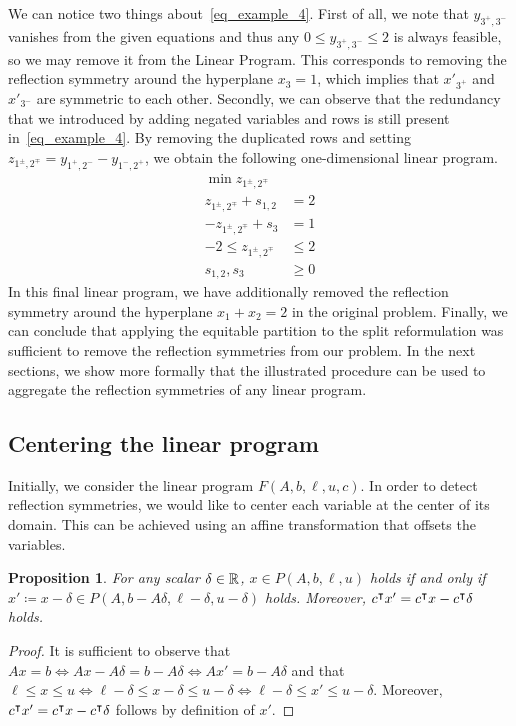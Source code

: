 \documentclass[pdflatex,sn-mathphys-num]{sn-jnl}%
\theoremstyle{thmstyleone}%
\newtheorem{proposition}[proposition]{Proposition}
\theoremstyle{thmstylethree}%
\theoremstyle{thmstyletwo}%
\begin{document}
We can notice two things about~\eqref{eq_example_4}. First of all, we note that $y_{3^+,3^-}$ vanishes from the given equations and thus any $0 \leq y_{3^+,3^-} \leq 2$ is always feasible, so we may remove it from the Linear Program. 
This corresponds to removing the reflection symmetry around the hyperplane $x_3 = 1$, which implies that $x'_{3^+}$ and $x'_{3^-}$ are symmetric to each other. Secondly, we can observe that the redundancy that we introduced by adding negated variables and rows is still present in~\eqref{eq_example_4}. By removing the duplicated rows and setting $z_{1^\pm,2^{\mp}} = y_{1^+,2^-} - y_{1^-,2^+}$, we obtain the following one-dimensional linear program. 
\begin{align*}
    \min z_{1^\pm, 2^\mp} & \\
    z_{1^\pm, 2^\mp} + s_{1,2} &= 2\\
    -z_{1^\pm, 2^\mp} + s_3 &= 1\\
    -2 \leq z_{1^\pm, 2^\mp} &\leq 2\\
    s_{1,2},s_3 &\geq 0
\end{align*}
In this final linear program, we have additionally removed the reflection symmetry around the hyperplane $x_1 + x_2 = 2$ in the original problem. Finally, we can conclude that applying the equitable partition to the split reformulation was sufficient to remove the reflection symmetries from our problem. In the next sections, we show more formally that the illustrated procedure can be used to aggregate the reflection symmetries of any linear program. 

\subsection{Centering the linear program}
Initially, we consider the linear program $F(A,b,\ell,u,c)$. In order to detect reflection symmetries, we would like to center each variable at the center of its domain. This can be achieved using an affine transformation that offsets the variables.

\begin{proposition}
\label{thm_affine_equivalent}
    For any scalar $\delta \in \mathbb{R}$, $x \in P(A,b,\ell,u)$ holds if and only if $x'\coloneqq x - \delta \in P(A,b- A \delta,\ell - \delta,u- \delta)$ holds. Moreover, $c^{\intercal} x' = c^{\intercal} x - c^{\intercal} \delta$ holds.
\end{proposition}
\begin{proof}
    It is sufficient to observe that $A x = b \iff A x - A \delta = b - A\delta \iff Ax' = b - A \delta$ and that $\ell \leq x \leq u \iff \ell - \delta \leq x - \delta \leq u -\delta \iff \ell - \delta \leq x' \leq u -\delta$. Moreover, $c^{\intercal} x' = c^{\intercal} x - c^{\intercal} \delta$ follows by definition of $x'$. 
\end{proof}
\end{document}
